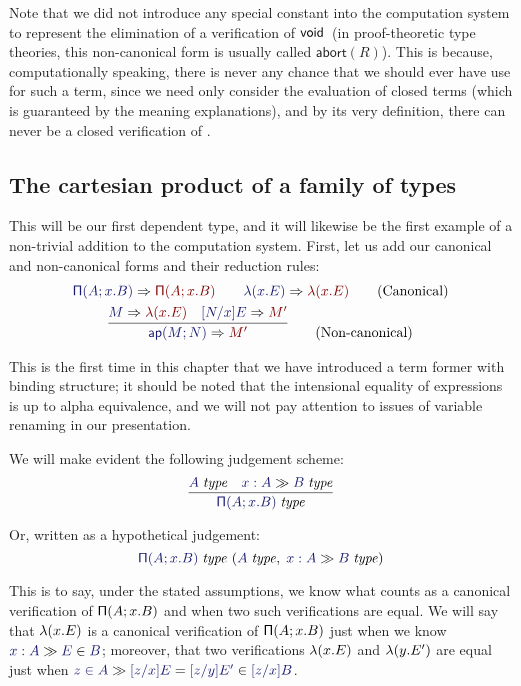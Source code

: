\documentclass[main.tex]{subfiles}
\begin{document}
Note that we did not introduce any special constant into the
computation system to represent the elimination of a verification of
$\mathsf{void}$\ (in proof-theoretic type theories, this non-canonical form
is usually called $\mathsf{abort}(R)$).  This is because,
computationally speaking, there is never any chance that we should
ever have use for such a term, since we need only consider the
evaluation of closed terms (which is guaranteed by the meaning
explanations), and by its very definition, there can never be a closed
verification of \tyvoid.

\subsection{The cartesian product of a family of types}

This will be our first dependent type, and it will likewise be the first
example of a non-trivial addition to the computation system. First, let us add
our canonical and non-canonical forms and their reduction rules:
\begin{gather*}
  \reduce{\typrod{A}{x}{B}}{\typrod{A}{x}{B}}
  \qquad
  \reduce{\lam{x}{E}}{\lam{x}{E}}
  \tag{Canonical}\\
  \infer{
    \reduce{\ap{M}{N}}{M'}
  }{
    \reduce{M}{\lam{x}{E}} &
    \reduce{[N/x]E}{M'}
  }\tag{Non-canonical}
\end{gather*}

This is the first time in this chapter that we have introduced a term former
with binding structure; it should be noted that the intensional equality of
expressions is up to alpha equivalence, and we will not pay attention to issues
of variable renaming in our presentation.

We will make evident the following judgement scheme:
\[
  \infer{
    \isset{\typrod{A}{x}{B}}
  }{
    \isset{A} &
    \sequent{x:A}{\isset{B}}
  }
\]

Or, written as a hypothetical judgement:
\[
  \hyp{\isset{\typrod{A}{x}{B}}}{\isset{A},\;\sequent{x:A}{\isset{B}}}
\]

This is to say, under the stated assumptions, we know what counts as a
canonical verification of $\mathsf{\Pi}(A;x.B)$ and when two such
verifications are equal. We will say that $\mathsf{\lambda}(x.E)$ is a canonical
verification of $\mathsf{\Pi}(A;x.B)$ just when we know
$\sequent{x:A}{\ver{E}{B}}$; moreover, that two verifications
$\mathsf{\lambda}(x.E)$ and $\mathsf{\lambda}(y.E')$ are equal just when
$\sequent{\ver{z}{A}}{\ever{[z/x]E}{[z/y]E'}{[z/x]B}}$.
\end{document}
